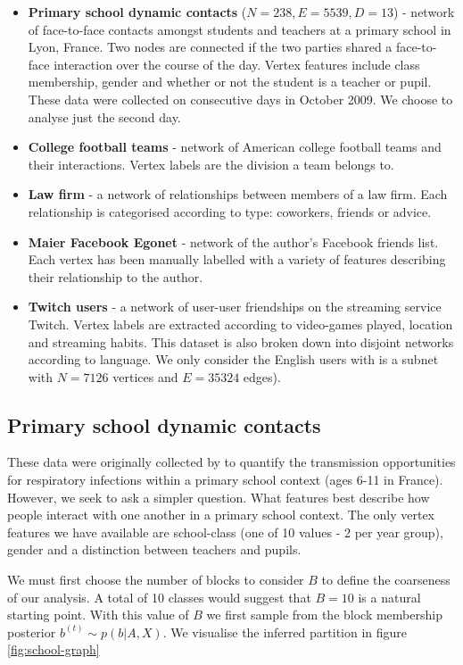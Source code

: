 \documentclass{article}
\begin{document}
\begin{itemize}
	\item \textbf{Primary school dynamic contacts} \cite{schools} ($N=238, E=5539, D=13$) - network of face-to-face contacts amongst students and teachers at a primary school in Lyon, France. Two nodes are connected if the two parties shared a face-to-face interaction over the course of the day. Vertex features include class membership, gender and whether or not the student is a teacher or pupil. These data were collected on consecutive days in October 2009. We choose to analyse just the second day. 
	\item \textbf{College football teams} \cite{Evans_2010_football} - network of American college football teams and their interactions. Vertex labels are the division a team belongs to.
	\item \textbf{Law firm} \cite{LawFirm} - a network of relationships between members of a law firm. Each relationship is categorised according to type: coworkers, friends or advice.
	\item \textbf{Maier Facebook Egonet} \cite{FB-Maier} - network of the author's Facebook friends list. Each vertex has been manually labelled with a variety of features describing their relationship to the author.
	\item \textbf{Twitch users} \cite{twitch} - a network of user-user friendships on the streaming service Twitch. Vertex labels are extracted according to video-games played, location and streaming habits. This dataset is also broken down into disjoint networks according to language. We only consider the English users with is a subnet with $N=7126$ vertices and $E=35324$ edges).
\end{itemize}

\subsection{Primary school dynamic contacts}

These data were originally collected by \citet{schools} to quantify the transmission opportunities for respiratory infections within a primary school context (ages 6-11 in France). However, we seek to ask a simpler question. What features best describe how people interact with one another in a primary school context. The only vertex features we have available are school-class (one of 10 values - 2 per year group), gender and a distinction between teachers and pupils.

We must first choose the number of blocks to consider $B$ to define the coarseness of our analysis. A total of 10 classes would suggest that $B=10$ is a natural starting point. With this value of $B$ we first sample from the block membership posterior $b^{(t)} \sim p(b | A, X)$. We visualise the inferred partition in figure \ref{fig:school-graph}
\end{document}
